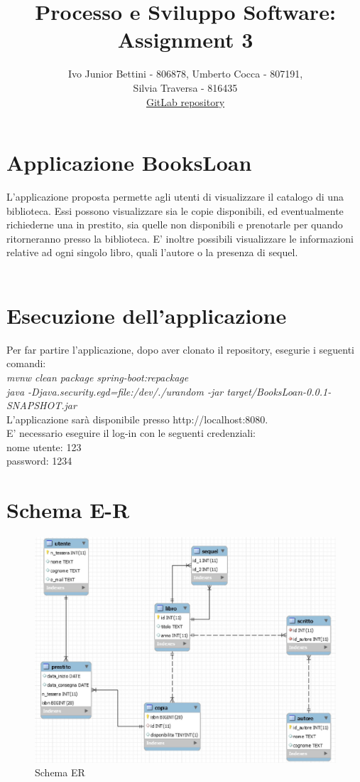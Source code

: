 \documentclass[a4paper,10pt]{article}
\title{Processo e Sviluppo Software: Assignment 3}
\author{Ivo Junior Bettini - 806878, Umberto Cocca - 807191, \\Silvia Traversa - 816435\\
\href{https://gitlab.com/s.traversa/2019_assignment3_booksloan}{GitLab repository}}
\date{}
\begin{document}
\maketitle 


\section*{Applicazione BooksLoan}
L'applicazione proposta permette agli utenti di visualizzare il catalogo di una biblioteca. Essi possono visualizzare sia le copie disponibili, ed eventualmente richiederne una in prestito, sia quelle non disponibili e prenotarle per quando ritorneranno presso la biblioteca.
E' inoltre possibili visualizzare le informazioni relative ad ogni singolo libro, quali l'autore o la presenza di sequel. \\\\

\section*{Esecuzione dell'applicazione}
Per far partire l'applicazione, dopo aver clonato il repository, esegurie i seguenti comandi:\\
\textit{mvnw clean package spring-boot:repackage}\\
\textit{java -Djava.security.egd=file:/dev/./urandom -jar target/BooksLoan-0.0.1-SNAPSHOT.jar}\\
L'applicazione sarà disponibile presso http://localhost:8080.\\
E' necessario eseguire il log-in con le seguenti credenziali:\\
nome utente: 123\\
password: 1234

\section*{Schema E-R}

\begin{figure}[H]
	\centering
	\includegraphics[width=0.7\linewidth]{images/ERdiagram}
	\caption[Schema ER]{Schema ER}
	\label{fig:re}
\end{figure}
\end{document}
